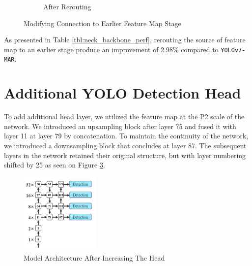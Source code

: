 \begin{figure}[H]
\begin{subfigure}[][][t]{0.4\textwidth}
      \caption{After Rerouting}
      \label{fig:deeperconn-after}
    \end{subfigure}
    \caption{Modifying Connection to Earlier Feature Map Stage}
    \label{fig:deeperconn}
\end{figure}

As presented in Table \ref{tbl:neck_backbone_perf}, rerouting the source of 
feature map to an earlier stage produce an improvement of 2.98\% compared to \verb*|YOLOv7-MAR|.

\begin{table}[H]
  \centering
  \label{tbl:neck_backbone_perf}
  \vspace{-1ex}
  
\end{table}

\vspace{2ex}

\section{Additional YOLO Detection Head}
To add additional head layer, we utilized the feature map at the P2 scale of the network.
We introduced an upsampling block after layer 75 and fused it with layer 11 at layer 79 by concatenation.
To maintain the continuity of the network, we introduced a downsampling block that concludes at layer 87.
The subsequent layers in the network retained their original structure, but with layer numbering shifted by 25
as seen on Figure \ref{fig:addinghead}.
\begin{figure}[H]
  \centering
  \includegraphics[width=0.35\textwidth]{figures/addheadn.png}
  \caption{Model Architecture After Increasing The Head}
  \label{fig:addinghead}
\end{figure}

